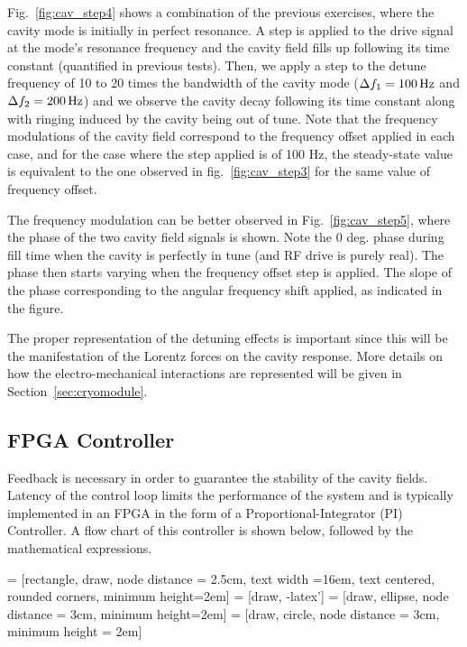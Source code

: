 \documentclass[a4paper,12pt]{article}
\begin{document}
Fig.~\ref{fig:cav_step4} shows a combination of the previous exercises, where the cavity mode is initially in perfect resonance. A step is applied to the drive signal at the mode's resonance frequency and the cavity field fills up following its time constant (quantified in previous tests). Then, we apply a step to the detune frequency of 10 to 20 times the bandwidth of the cavity mode ($\Delta f_1=100\,\rm Hz$ and $\Delta f_2=200\,\rm Hz$) and we observe the cavity decay following its time constant along with ringing induced by the cavity being out of tune. Note that the frequency modulations of the cavity field correspond to the frequency offset applied in each case, and for the case where the step applied is of 100 Hz, the steady-state value is equivalent to the one observed in fig.~\ref{fig:cav_step3} for the same value of frequency offset.

The frequency modulation can be better observed in Fig.~\ref{fig:cav_step5}, where the phase of the two cavity field signals is shown. Note the 0 deg. phase during fill time when the cavity is perfectly in tune (and RF drive is purely real). The phase then starts varying when the frequency offset step is applied. The slope of the phase corresponding to the angular frequency shift applied, as indicated in the figure.

The proper representation of the detuning effects is important since this will be the manifestation of the Lorentz forces on the cavity response. More details on how the electro-mechanical interactions are represented will be given in Section~\ref{sec:cryomodule}.

\subsection{FPGA Controller}

Feedback is necessary in order to guarantee the stability of the cavity fields. Latency of the control loop limits the performance of the system and is typically implemented in an FPGA in the form of a Proportional-Integrator (PI) Controller. A flow chart of this controller is shown below, followed by the mathematical expressions.

 = [rectangle, draw, node distance = 2.5cm, text width =16em, text centered, rounded corners, minimum height=2em]
 = [draw, -latex']
 = [draw, ellipse,  node distance = 3cm, minimum height=2em]
 = [draw, circle, node distance = 3cm, minimum height = 2em]
\end{document}
